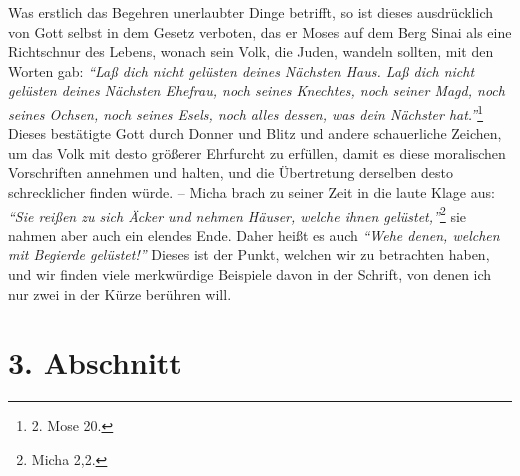 Was erstlich das Begehren unerlaubter Dinge betrifft, so ist dieses
ausdrücklich von Gott selbst in dem Gesetz verboten,
das er Moses auf dem
Berg Sinai als eine Richtschnur des Lebens, wonach
sein Volk, die Juden,
wandeln sollten, mit den Worten gab:
\textit{"`Laß dich nicht gelüsten deines Nächsten
Haus. Laß dich nicht gelüsten deines Nächsten Ehefrau, noch seines Knechtes,
noch seiner Magd, noch seines Ochsen, noch seines Esels, noch alles dessen, was
dein Nächster hat."'}\footnote{2. Mose 20.}
Dieses bestätigte Gott durch Donner und
Blitz und andere schauerliche Zeichen, um das Volk
mit desto größerer Ehrfurcht
zu erfüllen, damit es diese moralischen Vorschriften annehmen und halten, und
die Übertretung derselben desto schrecklicher finden würde. --
Micha brach zu
seiner Zeit in die laute Klage aus:
\textit{"`Sie reißen zu sich Äcker und nehmen
Häuser, welche ihnen gelüstet,"'}\footnote{Micha 2,2.}
sie nahmen aber auch ein
elendes Ende. Daher heißt es auch
\textit{"`Wehe denen, welchen mit Begierde gelüstet!"'}
Dieses ist der Punkt, welchen wir zu betrachten haben, und wir finden viele
merkwürdige Beispiele davon in der Schrift, von denen ich nur zwei in der Kürze
berühren will.

\section{3. Abschnitt} \label{kap13_ab3}

